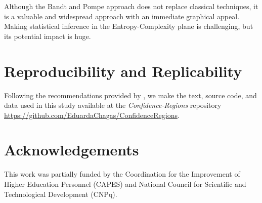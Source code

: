 \documentclass[alpha-refs]{wiley-article}
\begin{document}
Although the Bandt and Pompe approach does not replace classical techniques, it is a valuable and widespread approach with an immediate graphical appeal.
Making statistical inference in the Entropy-Complexity plane is challenging, but its potential impact is huge.

\section{Reproducibility and Replicability}\label{Sec:code}

Following the recommendations provided by \cite{ABadgingSystemforReproducibilityandReplicabilityinRemoteSensingResearch}, we make the text, source code, and data used in this study available at the \textit{Confidence-Regions} repository \url{https://github.com/EduardaChagas/ConfidenceRegions}.

\section{Acknowledgements}\label{Sec:acknowledgements}

This work was partially funded by the Coordination for the Improvement of Higher Education Personnel (CAPES) and National Council for Scientific and Technological Development (CNPq).

\printendnotes


\end{document}
